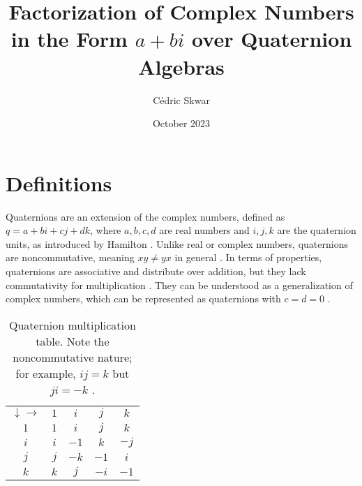 \documentclass[a4paper]{article}
\title{Factorization of Complex Numbers in the Form \(a + bi\) over Quaternion Algebras}
\author{Cédric Skwar}
\date{October 2023}
\begin{document}
\maketitle

\section{Definitions}
Quaternions are an extension of the complex numbers, defined as \( q = a + bi + cj + dk \), where \( a, b, c, d \) are real numbers and \( i, j, k \) are the quaternion units, as introduced by Hamilton \cite{hamilton1847elements}. Unlike real or complex numbers, quaternions are noncommutative, meaning \( xy \neq yx \) in general \cite{conway1997quaternions}. 
In terms of properties, quaternions are associative and distribute over addition, but they lack commutativity for multiplication \cite{conway1997quaternions}. They can be understood as a generalization of complex numbers, which can be represented as quaternions with \( c = d = 0 \) \cite{kuipers1999quaternions}.
\begin{table}[h]
    \centering
    \begin{tabular}{ccccc}
        \( \downarrow \rightarrow \) & \( 1 \) & \( i \) & \( j \) & \( k \) \\
        \( 1 \) & \( 1 \) & \( i \) & \( j \) & \( k \) \\
        \( i \) & \( i \) & \( -1 \) & \( k \) & \( -j \) \\
        \( j \) & \( j \) & \( -k \) & \( -1 \) & \( i \) \\
        \( k \) & \( k \) & \( j \) & \( -i \) & \( -1 \) \\
    \end{tabular}
    \caption{Quaternion multiplication table. Note the noncommutative nature; for example, \( ij = k \) but \( ji = -k \) \cite{ward1997quaternions}.}
    \label{tab:mult_table}
\end{table}



\end{document}
